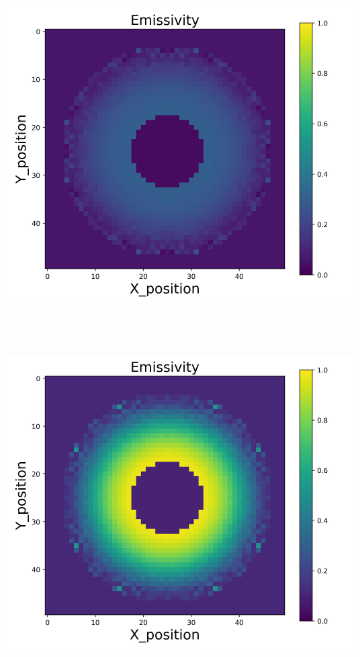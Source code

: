\begin{figure}[p]
\begin{minipage}{\textwidth}
\begin{subfigure}{0.325\textwidth}
        \end{subfigure}
        \begin{subfigure}{0.325\textwidth}
            \centering
            \includegraphics[width=\textwidth]{figures/raw_data/21/exp/emi_cal.jpg}
        \end{subfigure}
    \end{minipage}\\
    \begin{minipage}{\textwidth}
        \centering
        \begin{subfigure}{0.325\textwidth}
            \centering
            \includegraphics[width=\textwidth]{figures/raw_data/22/exp/emi_cal.jpg}

\end{subfigure}
\end{minipage}
\end{figure}
